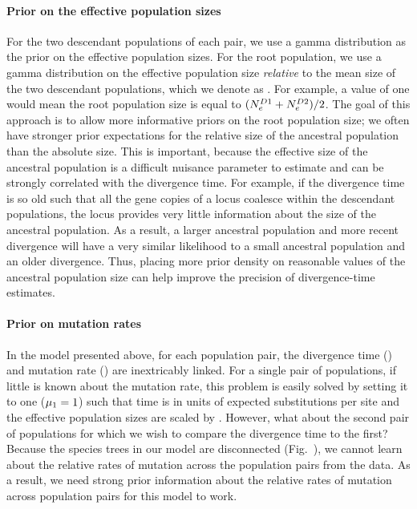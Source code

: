 \paragraph{Prior on the effective population sizes}
For the two descendant populations of each pair, we use a gamma distribution as
the prior on the effective population sizes.
For the root population, we use a gamma distribution on the effective
population size \emph{relative} to the mean size of the two descendant
populations, which we denote as \rootrelativepopsize.
For example, a value of one would mean the root population size is equal to 
$(\epopsize[\descendantpopindex{1}] + \epopsize[\descendantpopindex{2}]) / 2$.
The goal of this approach is to allow more informative priors on the root
population size; we often have stronger prior expectations for the relative
size of the ancestral population than the absolute size.
This is important, because the effective size of the ancestral population is a
difficult nuisance parameter to estimate and can be strongly correlated with
the divergence time.
For example, if the divergence time is so old such that all the gene copies
of a locus coalesce within the descendant populations, the locus
provides very little information about the size of the ancestral
population.
As a result, a larger ancestral population and more recent divergence will have
a very similar likelihood to a small ancestral population and an older
divergence.
Thus, placing more prior density on reasonable values of the ancestral
population size can help improve the precision of divergence-time estimates.

\paragraph{Prior on mutation rates}
In the model presented above, for each population pair, the divergence time
(\divtime) and mutation rate (\murate) are inextricably linked.
For a single pair of populations, if little is known about the mutation rate,
this problem is easily solved by setting it to one ($\murate[1] = 1$) such
that time is in units of expected substitutions per site and the effective
population sizes are scaled by \murate.
However, what about the second pair of populations for which we wish to compare
the divergence time to the first?
Because the species trees in our model are disconnected
(Fig.~),
we cannot learn about
the relative rates of mutation across the population pairs from the data.
As a result, we need strong prior information about the relative rates of
mutation across population pairs for this model to work.

